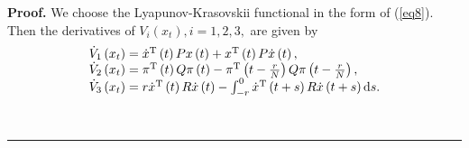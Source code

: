 \documentclass[9pt]{article}%
\newenvironment{proof}[1][Proof]{\noindent \textbf{#1.} }{\  \rule{0.5em}{0.5em}}
\begin{document}
\begin{proof}
We choose the Lyapunov-Krasovskii functional in the form of (\ref{eq8}). Then
the derivatives of $V_{i}\left(  x_{t}\right)  ,i=1,2,3,$ are given by%
\begin{equation}
\left.
\begin{array}
[c]{l}%
\dot{V}_{1}\left(  x_{t}\right)  =\dot{x}^{\mathrm{T}}\left(  t\right)
Px\left(  t\right)  +x^{\mathrm{T}}\left(  t\right)  P\dot{x}\left(  t\right)
,\\
\dot{V}_{2}\left(  x_{t}\right)  =\pi^{\mathrm{T}}\left(  t\right)
Q\pi \left(  t\right)  -\pi^{\mathrm{T}}\left(  t-\frac{r}{N}\right)
Q\pi \left(  t-\frac{r}{N}\right)  ,\\
\dot{V}_{3}\left(  x_{t}\right)  =r\dot{x}^{\mathrm{T}}\left(  t\right)
R\dot{x}\left(  t\right)  -\int_{-r}^{0}\dot{x}^{\mathrm{T}}\left(
t+s\right)  R\dot{x}\left(  t+s\right)  \mathrm{d}s.
\end{array}
\right.  \label{eq10}%
\end{equation}



\end{proof}
\end{document}
